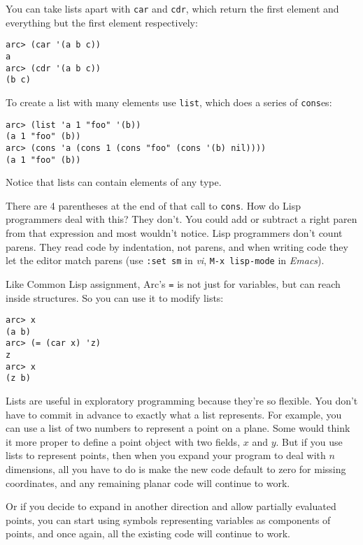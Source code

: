 \documentclass[a4paper,12pt]{book}
\begin{document}
You can take lists apart with \verb|car| and \verb|cdr|, which return the first
element and everything but the first element respectively:

\begin{verbatim}
arc> (car '(a b c))
a
arc> (cdr '(a b c))
(b c)
\end{verbatim}

To create a list with many elements use \verb|list|, which does a series
of \verb|cons|es:

\begin{verbatim}
arc> (list 'a 1 "foo" '(b))                      
(a 1 "foo" (b))
arc> (cons 'a (cons 1 (cons "foo" (cons '(b) nil))))
(a 1 "foo" (b))
\end{verbatim}

Notice that lists can contain elements of any type.

There are 4 parentheses at the end of that call to \verb|cons|.  How do
{\sc{}Lisp} programmers deal with this?  They don't.  You could add or
subtract a right paren from that expression and most wouldn't notice.
{\sc{}Lisp} programmers don't count parens.  They read code by indentation,
not parens, and when writing code they let the editor match parens
(use \verb|:set sm| in {\em{}vi}, \verb|M-x lisp-mode| in {\em{}Emacs}).

Like {\sc{}Common Lisp} assignment, {\sc{}Arc}'s {\tt=} is not just for variables, but
can reach inside structures.  So you can use it to modify lists:

\begin{verbatim}
arc> x
(a b)
arc> (= (car x) 'z)
z
arc> x
(z b)
\end{verbatim}

Lists are useful in exploratory programming because they're so
flexible.  You don't have to commit in advance to exactly what a
list represents.  For example, you can use a list of two numbers
to represent a point on a plane.  Some would think it more proper
to define a point object with two fields, $x$ and $y$.  But if you use
lists to represent points, then when you expand your program to
deal with $n$ dimensions, all you have to do is make the new code
default to zero for missing coordinates, and any remaining planar
code will continue to work.

Or if you decide to expand in another direction and allow partially
evaluated points, you can start using symbols representing variables
as components of points, and once again, all the existing code will
continue to work.
\end{document}
